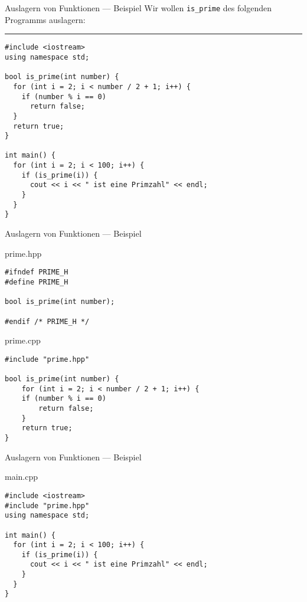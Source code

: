 \documentclass[presentation]{beamer}
\begin{document}
\begin{frame}[label={sec:orga9e3f7e},fragile]{Auslagern von Funktionen --- Beispiel}
 Wir wollen {\color{solarizedYellow}\verb!is_prime!} des folgenden Programms auslagern:

\noindent\rule{\textwidth}{0.5pt}
\begin{verbatim}
#include <iostream>
using namespace std;

bool is_prime(int number) {
  for (int i = 2; i < number / 2 + 1; i++) {
    if (number % i == 0)
      return false;
  }
  return true;
}

int main() {
  for (int i = 2; i < 100; i++) {
    if (is_prime(i)) {
      cout << i << " ist eine Primzahl" << endl;
    }
  }
}
\end{verbatim}
\end{frame}
\begin{frame}[label={sec:org74de123},fragile]{Auslagern von Funktionen --- Beispiel}
 \begin{block}{prime.hpp}
\begin{verbatim}
#ifndef PRIME_H
#define PRIME_H

bool is_prime(int number);

#endif /* PRIME_H */
\end{verbatim}
\end{block}
\begin{block}{prime.cpp}
\begin{verbatim}
#include "prime.hpp"

bool is_prime(int number) {
    for (int i = 2; i < number / 2 + 1; i++) {
	if (number % i == 0)
	    return false;
    }
    return true;
}
\end{verbatim}
\end{block}
\end{frame}
\begin{frame}[label={sec:org43ff812},fragile]{Auslagern von Funktionen --- Beispiel}
 \begin{block}{main.cpp}
\begin{verbatim}
#include <iostream>
#include "prime.hpp"
using namespace std;

int main() {
  for (int i = 2; i < 100; i++) {
    if (is_prime(i)) {
      cout << i << " ist eine Primzahl" << endl;
    }
  }
}
\end{verbatim}
\end{block}
\end{frame}
\end{document}
